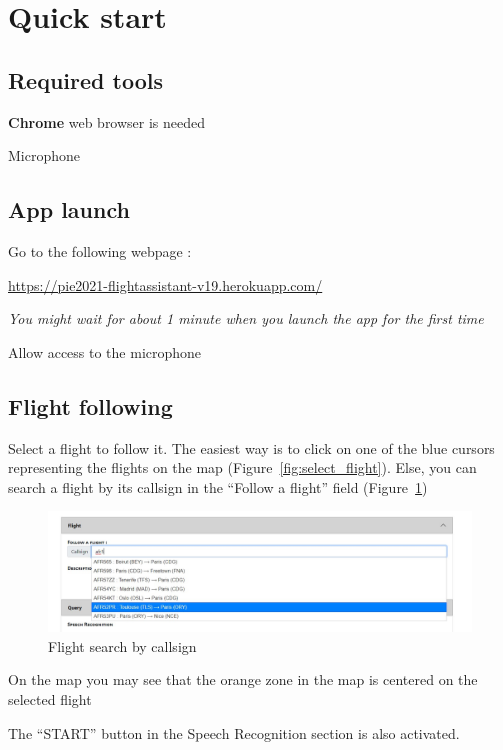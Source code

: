\documentclass[12pt,oneside,a4]{article}
\let\tempone\itemize
\let\temptwo\enditemize
\renewenvironment{itemize}{\tempone\addtolength{\itemsep}{-0.5\baselineskip}}{\temptwo}
\newcommand{\linkdeploy}{https://pie2021-flightassistant-v19.herokuapp.com/}
\begin{document}
\section{Quick start}

\subsection{Required tools}
\begin{itemize}
    \item \textbf{Chrome} web browser is needed
    \item Microphone
\end{itemize}

\subsection{App launch}
\begin{itemize}
    \item Go to the following webpage : 
    \begin{center}
        \vspace{-.4em}
        \url{\linkdeploy}
    \end{center}
    \textit{You might wait for about 1 minute when you launch the app for the first time}
    \item Allow access to the microphone
\end{itemize}

\subsection{Flight following}

\begin{itemize}
    \item Select a flight to follow it. The easiest way is to click on one of the blue cursors representing the flights on the map (Figure~\ref{fig:select_flight}). 
    Else, you can search a flight by its callsign in the ``Follow a flight'' field (Figure~\ref{fig:search_flight})
    \begin{figure}[h!]
        \centering
        \includegraphics[width=.98\linewidth]{search_flight.jpg}
        \caption{Flight search by callsign}
        \label{fig:search_flight}
    \end{figure}
    \item On the map you may see that the orange zone in the map is centered on the selected flight
    \item The ``START'' button in the Speech Recognition section is also activated.
\end{itemize}
\end{document}
